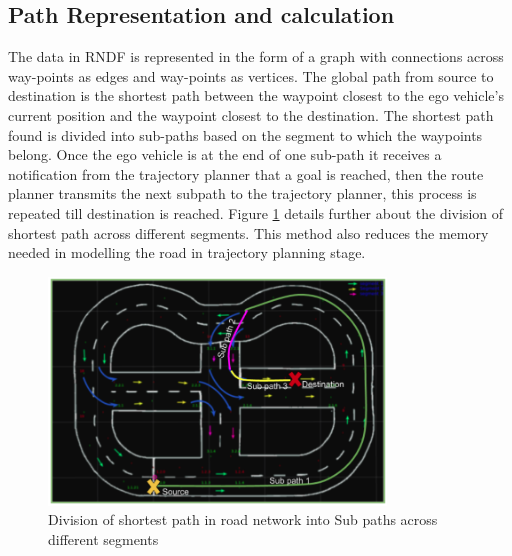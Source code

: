 

\subsection{Path Representation and calculation}

The data in RNDF is represented in the form of a graph with connections across way-points as edges and way-points as vertices. The global path from source to destination is the shortest path between the waypoint closest to the ego vehicle's current position and the waypoint closest to the destination. The shortest path found is divided into sub-paths based on the segment to which the waypoints belong. Once the ego vehicle is at the end of one sub-path it receives a notification from the trajectory planner that a goal is reached, then the route planner transmits the next subpath to the trajectory planner, this process is repeated till destination is reached. Figure \ref{path_Segmentation} details further about the division of shortest path across different segments. This method also reduces the memory needed in modelling the road in trajectory planning stage.

\begin{figure}
    \centering
    \includegraphics[width=0.8\textwidth]{Images/path_Segmentation.png}
    \caption{Division of shortest path in road network into Sub paths across different segments}
    \label{path_Segmentation}
\end{figure}

